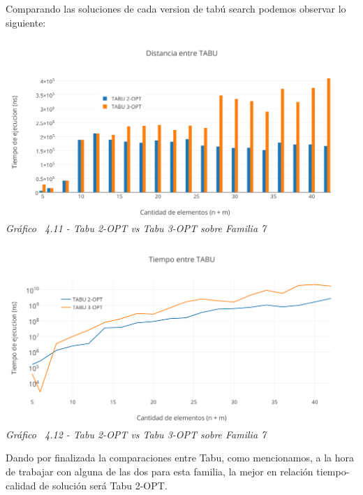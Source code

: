 Comparando las soluciones de cada version de tabú search podemos observar lo siguiente: 
  
\vspace*{0.3cm} \vspace*{0.3cm}
  \begin{center}
 \includegraphics[scale=0.5]{./EJ4/comparativoanillos1.png}\\
 {            \textit{Gráfico \ 4.11 - Tabu 2-OPT vs Tabu 3-OPT sobre Familia 7}}
  \end{center}
  \vspace*{0.3cm}

\vspace*{0.3cm} \vspace*{0.3cm}
  \begin{center}
 \includegraphics[scale=0.5]{./EJ4/comparativoanillos.png}\\
 {            \textit{Gráfico \ 4.12 - Tabu 2-OPT vs Tabu 3-OPT sobre Familia 7}}
  \end{center}
  \vspace*{0.3cm}
  
Dando por finalizada la comparaciones entre Tabu, como mencionamos, a la hora de trabajar con alguna de las dos para esta familia, la mejor en relaci\'on tiempo-calidad de soluci\'on ser\'a Tabu 2-OPT.

